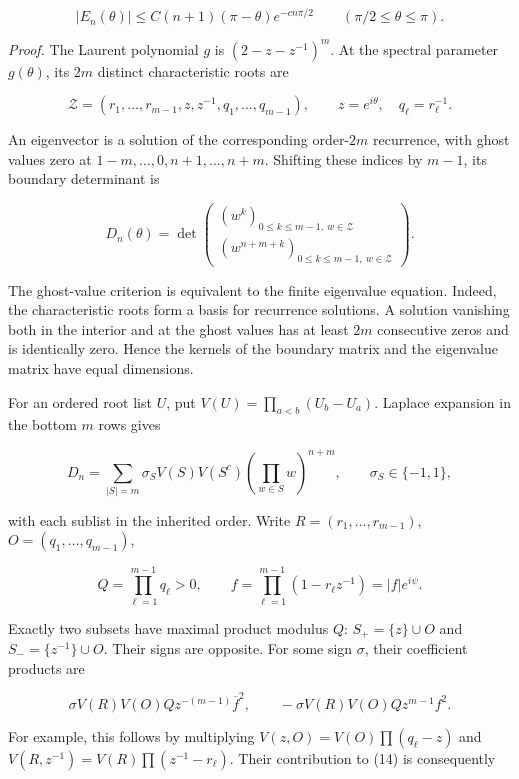 \documentclass[10pt,a4paper]{article}
\begin{document}
\nopagebreak[3]
\[
|E_n(\theta)|\le C(n+1)(\pi-\theta)e^{-cn\pi/2}
\qquad(\pi/2\le\theta\le\pi).
\tag{12}
\]

\emph{Proof.} The Laurent polynomial \(g\) is \((2-z-z^{-1})^m\). At the spectral parameter \(g(\theta)\), its \(2m\) distinct characteristic roots are

\nopagebreak[3]
\[
\mathcal Z=(r_1,\ldots,r_{m-1},z,z^{-1},q_1,\ldots,q_{m-1}),\qquad
z=e^{i\theta},\quad q_\ell=r_\ell^{-1}.
\]

An eigenvector is a solution of the corresponding order-\(2m\) recurrence, with ghost values zero at \(1-m,\ldots,0,n+1,\ldots,n+m\). Shifting these indices by \(m-1\), its boundary determinant is

\nopagebreak[3]
\[
D_n(\theta)=\det\begin{pmatrix}
 (w^k)_{0\le k\le m-1,\ w\in\mathcal Z}\\
 (w^{n+m+k})_{0\le k\le m-1,\ w\in\mathcal Z}
\end{pmatrix}.
\tag{13}
\]

The ghost-value criterion is equivalent to the finite eigenvalue equation. Indeed, the characteristic roots form a basis for recurrence solutions. A solution vanishing both in the interior and at the ghost values has at least \(2m\) consecutive zeros and is identically zero. Hence the kernels of the boundary matrix and the eigenvalue matrix have equal dimensions.

For an ordered root list \(U\), put \(V(U)=\prod_{a<b}(U_b-U_a)\). Laplace expansion in the bottom \(m\) rows gives

\nopagebreak[3]
\[
D_n=\sum_{|S|=m}\sigma_S V(S)V(S^c)
             \left(\prod_{w\in S}w\right)^{n+m},\qquad \sigma_S\in\{-1,1\},
\tag{14}
\]

with each sublist in the inherited order. Write \(R=(r_1,\ldots,r_{m-1})\), \(O=(q_1,\ldots,q_{m-1})\),

\nopagebreak[3]
\[
Q=\prod_{\ell=1}^{m-1}q_\ell>0,\qquad
f=\prod_{\ell=1}^{m-1}(1-r_\ell z^{-1})=|f|e^{i\psi}.
\]

Exactly two subsets have maximal product modulus \(Q\): \(S_+=\{z\}\cup O\) and \(S_-=\{z^{-1}\}\cup O\). Their signs are opposite. For some sign \(\sigma\), their coefficient products are

\nopagebreak[3]
\[
\sigma V(R)V(O)Q z^{-(m-1)}\overline f^{2},\qquad
-\sigma V(R)V(O)Q z^{m-1}f^2.
\tag{15}
\]

For example, this follows by multiplying \(V(z,O)=V(O)\prod(q_\ell-z)\) and \(V(R,z^{-1})=V(R)\prod(z^{-1}-r_\ell)\). Their contribution to (14) is consequently
\end{document}

